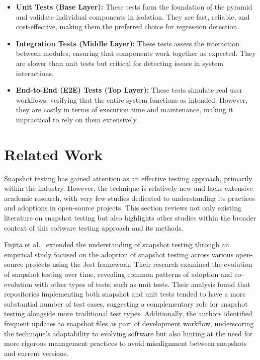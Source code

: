 \documentclass[
	msc, %
	english %
]{../ppgccufmg}
\begin{document}
        \begin{itemize}
        
            \item\textbf{Unit Tests (Base Layer):} These tests form the foundation of the pyramid and validate individual components in isolation. They are fast, reliable, and cost-effective, making them the preferred choice for regression detection.
            
            \item\textbf{Integration Tests (Middle Layer):} These tests assess the interaction between modules, ensuring that components work together as expected. They are slower than unit tests but critical for detecting issues in system interactions.
            
            \item\textbf{End-to-End (E2E) Tests (Top Layer):} These tests simulate real user workflows, verifying that the entire system functions as intended. However, they are costly in terms of execution time and maintenance, making it impractical to rely on them extensively.
            
        \end{itemize}
        

        \section{Related Work}\label{sec:ch2-related-work}

        Snapshot testing has gained attention as an effective testing approach, primarily within the industry. However, the technique is relatively new and lacks extensive academic research, with very few studies dedicated to understanding its practices and adoptions in open-source projects. This section reviews not only existing literature on snapshot testing but also highlights other studies within the broader context of this software testing approach and its methods.
        
        Fujita et al.~\cite{fujita2023empirical} extended the understanding of snapshot testing through an empirical study focused on the adoption of snapshot testing across various open-source projects using the Jest framework. Their research examined the evolution of snapshot testing over time, revealing common patterns of adoption and co-evolution with other types of tests, such as unit tests. Their analysis found that repositories implementing both snapshot and unit tests tended to have a more substantial number of test cases, suggesting a complementary role for snapshot testing alongside more traditional test types. Additionally, the authors identified frequent updates to snapshot files as part of development workflow, underscoring the technique's adaptability to evolving software but also hinting at the need for more rigorous management practices to avoid misalignment between snapshots and current versions.
\end{document}
